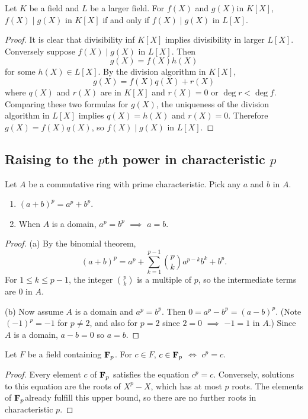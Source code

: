 \begin{theorem}
  Let $K$ be a field and $L$ be a larger field. For $f(X)$ and $g(X)$in
  $K[X]$, $f(X)\mid g(X)$ in $K[X]$ if and only if $f(X)\mid g(X)$ in
  $L[X]$.
\end{theorem}
\begin{proof}
  It is clear that divisibility inf $K[X]$ implies divisibility in larger
  $L[X]$. Conversely suppose $f(X)\mid g(X)$ in $L[X]$. Then
  \[
    g(X)=f(X)h(X)
  \]
  for some $h(X)\in L[X]$. By the division algorithm in $K[X]$,
  \[
    g(X)=f(X)q(X)+r(X)
  \]
  where $q(X)$ and $r(X)$ are in $K[X]$ and $r(X)=0$ or $\deg r<\deg
  f$. Comparing these two formulas for $g(X)$, the uniqueness of the
  division algorithm in $L[X]$ implies $q(X)=h(X)$ and $r(X)=0$. Therefore
  $g(X)=f(X)q(X)$, so $f(X)\mid g(X)$ in $L[X]$.
\end{proof}

\subsection[Raising to the pth power in characteristic p]{Raising to the $p$th power in characteristic $p$}
\begin{lemma}
  Let $A$ be a commutative ring with prime characteristic. Pick any $a$ and
  $b$ in $A$.
  \begin{enumerate}[label=\textnormal{(\alph*)}]
  \item $(a+b)^p=a^p+b^p$.
  \item When $A$ is a domain, $a^p=b^p$ $\implies$ $a=b$.
  \end{enumerate}
\end{lemma}
\begin{proof}
  (a) By the binomial theorem,
  \[
    (a+b)^p=a^p+\sum_{k=1}^{p-1}\binom{p}{k}a^{p-k}b^k+b^p.
  \]
  For $1\leq k\leq p-1$, the integer $\binom{p}{k}$ is a multiple of $p$,
  so the intermediate terms are $0$ in $A$.

  (b) Now assume $A$ is a domain and $a^p=b^p$. Then
  $0=a^p-b^p=(a-b)^p$. (Note $(-1)^p=-1$ for $p\neq 2$, and also for $p=2$
  since $2=0$ $\implies$ $-1=1$ in $A$.) Since $A$ is a domain, $a-b=0$ so
  $a=b$.
\end{proof}

\begin{lemma}
  Let $F$ be a field containing $\mathbf{F}_p$. For $c\in F$, $c\in\mathbf{F}_p$ $\iff$
  $c^p=c$.
\end{lemma}
\begin{proof}
  Every element $c$ of $\mathbf{F}_p$ satisfies the equation $c^p=c$. Conversely,
  solutions to this equation are the roots of $X^p-X$, which has at most
  $p$ roots. The elements of $\mathbf{F}_p$already fulfill this upper bound, so
  there are no further roots in characteristic $p$.
\end{proof}

